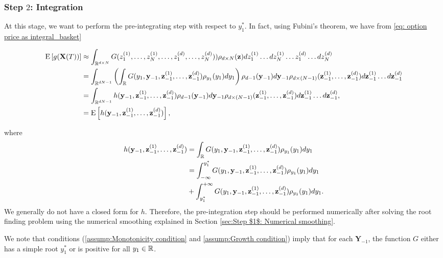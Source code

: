 \subsubsection{Step $2$: Integration}\label{sec:Step $2$: Integration}
At this stage, we want to perform the pre-integrating step with respect to  $y^\ast_1$. In fact, using Fubini's theorem, we have from \eqref{eq: option price as integral_basket}
\begin{small}
\begin{align}\label{eq: pre_integration_step_wrt_y1_basket}
	\mathrm{E}\left[g(\mathbf{X}(T))\right]&\approx\int_{\mathbb{R}^{d \times N}} G(z_1^{(1)}, \dots, z_N^{(1)}, \dots, z_1^{(d)},\dots,z^{(d)}_N)) \rho_{d \times N}(\mathbf{z}) dz_1^{(1)} \dots dz_N^{(1)} \dots z_1^{(d)} \dots dz^{(d)}_N \nonumber\\ 
	&=\int_{\mathbb{R}^{dN-1}} \left(\int_{\mathbb{R}} G(y_1,\mathbf{y}_{-1},\mathbf{z}^{(1)}_{-1},\dots,\mathbf{z}^{(d)}_{-1} ) \rho_{y_1}(y_1) dy_1 \right)\rho_{d-1}(\mathbf{y}_{-1}) d\mathbf{y}_{-1} \rho_{d \times(N-1)}(\mathbf{z}_{-1}^{(1)},\dots,\mathbf{z}_{-1}^{(d)}) d\mathbf{z}_{-1}^{(1)}\dots d\mathbf{z}_{-1}^{(d)} \nonumber\\	
	&=\int_{\mathbb{R}^{dN-1}} h(\mathbf{y}_{-1},\mathbf{z}^{(1)}_{-1},\dots,\mathbf{z}^{(d)}_{-1} )\rho_{d-1}(\mathbf{y}_{-1}) d\mathbf{y}_{-1}  \rho_{d\times (N-1)}(\mathbf{z}_{-1}^{(1)},\dots,\mathbf{z}_{-1}^{(d)}) d\mathbf{z}^{(1)}_{-1} \dots d\mathbf{z}^{(d)}_{-1}, \\ \nonumber
	&=\mathrm{E}\left[h(\mathbf{y}_{-1}, \mathbf{z}^{(1)}_{-1},\dots,\mathbf{z}^{(d)}_{-1} )\right] ,
\end{align}
\end{small}
where
\begin{align}\label{eq:smooth_function_after_pre_integration}
 h(\mathbf{y}_{-1},\mathbf{z}^{(1)}_{-1},\dots,\mathbf{z}^{(d)}_{-1})&=\int_{\mathbb{R}} G(y_1,\mathbf{y}_{-1},\mathbf{z}^{(1)}_{-1},\dots,\mathbf{z}^{(d)}_{-1} ) \rho_{y_1}(y_1) dy_1 \nonumber\\
 &= \int_{-\infty}^{y^\ast_1} G(y_1,\mathbf{y}_{-1},\mathbf{z}^{(1)}_{-1},\dots,\mathbf{z}^{(d)}_{-1} ) \rho_{y_1}(y_1) dy_1\nonumber\\
 &+ \int_{y_1^\ast}^{+\infty} G(y_1,\mathbf{y}_{-1},\mathbf{z}^{(1)}_{-1},\dots,\mathbf{z}^{(d)}_{-1} ) \rho_{y_1}(y_1) dy_1 .
\end{align}
We generally do not have a closed form for $h$. Therefore, the pre-integration step should be performed numerically after solving the root finding problem using the numerical smoothing explained in Section \ref{sec:Step $1$: Numerical smoothing}.
\begin{remark}
We note that  conditions (\eqref{assump:Monotonicity condition} and \eqref{assump:Growth condition}) imply that for each $\mathbf{Y}_{-1}$, the function $G$ either has a simple  root $y_1^\ast$ or is positive for all $y_1 \in \mathbb{R}$.
\end{remark}
